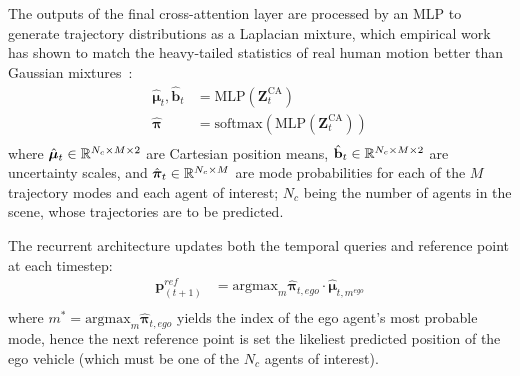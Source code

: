 \begin{description}[leftmargin=1em,itemsep=2pt]
\begin{description}[leftmargin=1em,itemsep=2pt]
\item[Autoregressive Decoding with Mixture Outputs.] The outputs of the final cross-attention layer are processed by an MLP to generate trajectory distributions as a Laplacian mixture, which empirical work has shown to match the heavy-tailed statistics of real human motion better than Gaussian mixtures~\cite{zhou2022hivt,caspformerYadav2024}:
\begin{equation}
\label{eq:mixture_trajectory_output}
\begin{aligned}
\hat{\boldsymbol{\mu}}_{t}, \hat{\mathbf{b}}_{t} &= \text{MLP}(\mathbf{Z}^{\text{CA}}_t)\\
\hat{\boldsymbol{\pi}} &= \text{softmax}(\text{MLP}(\mathbf{Z}^{\text{CA}}_t)) \\
\end{aligned}
\end{equation}
where \(\hat{\boldsymbol{\mu}}_{t} \in \mathbb{R}^{N_c \times M \times 2}\) are Cartesian position means, \(\hat{\mathbf{b}}_{t} \in \mathbb{R}^{N_c \times M \times 2}\) are uncertainty scales, and \(\hat{\boldsymbol{\pi}}_t \in \mathbb{R}^{N_c \times M}\) are mode probabilities for each of the \(M\) trajectory modes and each agent of interest; \( N_c \) being the number of agents in the scene, whose trajectories are to be predicted.

The recurrent architecture updates both the temporal queries and reference point at each timestep:
\begin{equation}
\label{eq:recurrent_updates}
\begin{aligned}
\mathbf{p}^{ref}_{(t+1)} &= \text{argmax}_m \hat{\boldsymbol{\pi}}_{t,ego} \cdot \hat{\boldsymbol{\mu}}_{t,m^{ego}} \\
\end{aligned}
\end{equation}
where \(m^* = \text{argmax}_m \hat{\boldsymbol{\pi}}_{t,ego}\) yields the index of the ego agent's most probable mode, hence the next reference point is set the likeliest predicted position of the ego vehicle (which must be one of the \( N_c \) agents of interest).
\end{description}


\end{description}
